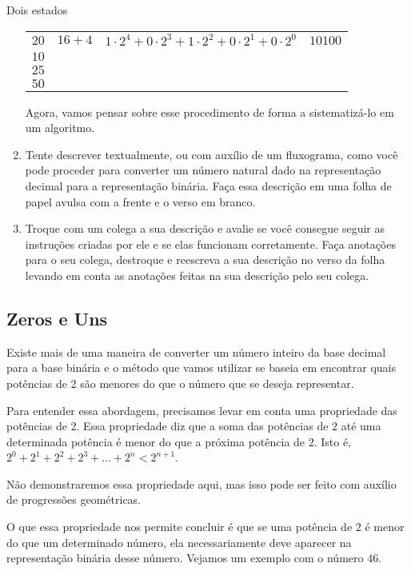 \begin{task}{Dois estados}
\begin{enumerate}
\begin{table}[H]
\begin{tabular}{|e{.175\linewidth}|e{.15\linewidth}|c|e{.175\linewidth}|}
\hline
{} &  &  &  \tabularnewline
\hline
$20$ & $16+4$ & $1\cdot2^4+0\cdot2^3+1\cdot2^2+0\cdot2^1+0\cdot2^0$ & $10100$ \tabularnewline
\hline
$10$ & & & \tabularnewline
\hline
$25$ & & & \tabularnewline
\hline
$50$ & & & \tabularnewline
\hline
\end{tabular}
\end{table}

Agora, vamos pensar sobre esse procedimento de forma a sistematizá-lo em um algoritmo.

\item Tente descrever textualmente, ou com auxílio de um fluxograma, como você pode proceder para converter um número natural dado na representação decimal para a representação binária. Faça essa descrição em uma folha de papel avulsa com a frente e o verso em branco.

\item Troque com um colega a sua descrição e avalie se você consegue seguir as instruções criadas por ele e se elas funcionam corretamente. Faça anotações para o seu colega, destroque e reescreva a sua descrição no verso da folha levando em conta as anotações feitas na sua descrição pelo seu colega.
\end{enumerate}
\end{task}

\subsection{Zeros e Uns}

Existe mais de uma maneira de converter um número inteiro da base decimal para a base binária e o método que vamos utilizar se baseia em encontrar quais potências de 2 são menores do que o número que se deseja representar.

Para entender essa abordagem, precisamos levar em conta uma propriedade das potências de 2. Essa propriedade diz que a soma das potências de $2$ até uma determinada potência  é menor do que a próxima potência de $2$. Isto é, $2^0+2^1+2^2+2^3+\dots+2^n<2^{n+1}$.

Não demonstraremos essa propriedade aqui, mas isso pode ser feito com auxílio de progressões geométricas.

O que essa propriedade nos permite concluir é que se uma potência de $2$ é menor do que um determinado número, ela necessariamente deve aparecer na representação binária desse número. Vejamos um exemplo com o número $46$.


